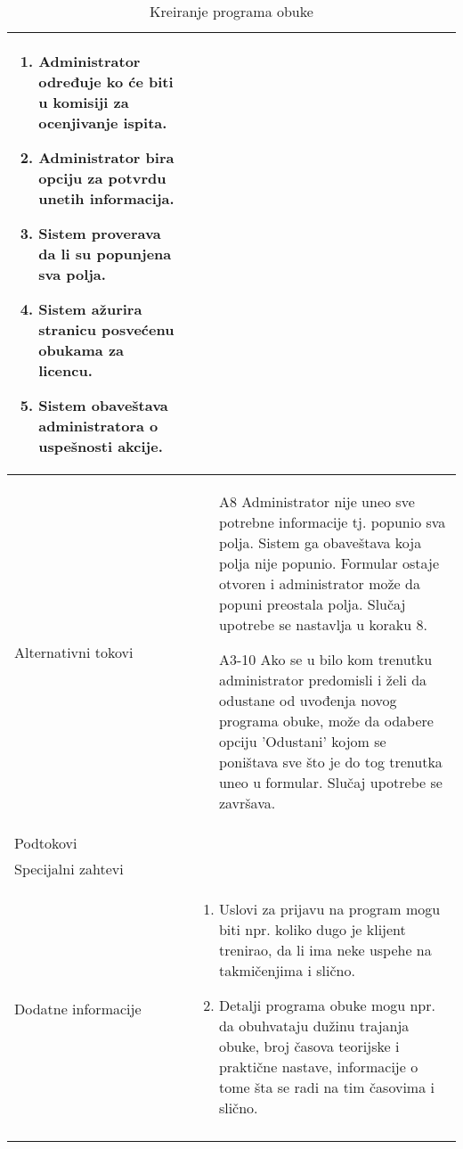 \documentclass[../../main.tex]{subfiles}
\begin{document}
\begin{longtable}{| p{} | p{} |}
\begin{enumerate}
        \item Administrator određuje ko će biti u komisiji za ocenjivanje ispita.
        \item Administrator bira opciju za potvrdu unetih informacija.
        \item Sistem proverava da li su popunjena sva polja.
        \item Sistem ažurira stranicu posvećenu obukama za licencu.
        \item Sistem obaveštava administratora o uspešnosti akcije.
    \end{enumerate}\\
\hline
    Alternativni tokovi & 
    \begin{itemize}
        \item[A8] Administrator nije uneo sve potrebne informacije tj. popunio sva polja. Sistem ga obaveštava koja polja nije popunio. Formular ostaje otvoren i administrator može da popuni preostala polja. Slučaj upotrebe se nastavlja u koraku 8.
        \item[A3-10] Ako se u bilo kom trenutku administrator predomisli i želi da odustane od uvođenja novog programa obuke, može da odabere opciju 'Odustani' kojom se poništava sve što je do tog trenutka uneo u formular. Slučaj upotrebe se završava.
    \end{itemize} \\
\hline
    Podtokovi & \\
\hline
    Specijalni zahtevi & \\
\hline
    Dodatne informacije &
    \begin{enumerate}
        \item Uslovi za prijavu na program mogu biti npr. koliko dugo je klijent trenirao, da li ima neke uspehe na takmičenjima i slično. 
        \item Detalji programa obuke mogu npr. da obuhvataju dužinu trajanja obuke, broj časova teorijske i praktične nastave, informacije o tome šta se radi na tim časovima i slično.
    \end{enumerate}\\
\hline
\caption{Kreiranje programa obuke}
\end{longtable}
\end{document}
